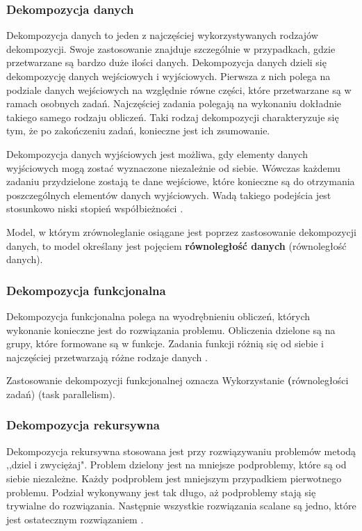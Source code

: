 \documentclass[12pt]{article}
\begin{document}
\subsubsection{Dekompozycja danych}
Dekompozycja danych to jeden z najczęściej wykorzystywanych rodzajów dekompozycji. Swoje zastosowanie znajduje szczególnie w przypadkach,
gdzie przetwarzane są bardzo duże ilości danych. Dekompozycja danych dzieli się dekompozycję danych wejściowych i wyjściowych.
Pierwsza z nich polega na podziale danych wejściowych na względnie równe części, które przetwarzane są w ramach osobnych zadań. Najczęściej
zadania polegają na wykonaniu dokładnie takiego samego rodzaju obliczeń. Taki rodzaj dekompozycji charakteryzuje się tym,
że po zakończeniu zadań, konieczne jest ich zsumowanie.

Dekompozycja danych wyjściowych jest możliwa, gdy elementy danych wyjściowych mogą zostać wyznaczone niezależnie od siebie.
Wówczas każdemu zadaniu przydzielone zostają te dane wejściowe, które konieczne są do otrzymania poszczególnych elementów
danych wyjściowych. Wadą takiego podejścia jest stosunkowo niski stopień współbieżności \cite{wprowadzenie-do-obliczen-rownoleglych}.

Model, w którym zrównoleglanie osiągane jest poprzez zastosowanie dekompozycji danych, to model określany jest pojęciem
\textbf{równoległość danych} (równoległość danych). 

\subsubsection{Dekompozycja funkcjonalna}
Dekompozycja funkcjonalna polega na wyodrębnieniu obliczeń, których wykonanie konieczne jest do rozwiązania problemu. Obliczenia dzielone są
na grupy, które formowane są w funkcje. Zadania funkcji różnią się od siebie i najczęściej przetwarzają różne rodzaje danych
\cite{wprowadzenie-do-obliczen-rownoleglych}.

Zastosowanie dekompozycji funkcjonalnej oznacza Wykorzystanie \textbf(równoległości zadań) (task parallelism).

\subsubsection{Dekompozycja rekursywna}
Dekompozycja rekursywna stosowana jest przy rozwiązywaniu problemów metodą ,,dziel i zwyciężaj". Problem dzielony jest na
mniejsze podproblemy, które są od siebie niezależne. Każdy podproblem jest mniejszym przypadkiem pierwotnego problemu. Podział
wykonywany jest tak długo, aż podproblemy stają się trywialne do rozwiązania. Następnie wszystkie rozwiązania scalane są jedno,
które jest ostatecznym rozwiązaniem \cite{wprowadzenie-do-obliczen-rownoleglych}.
\end{document}
